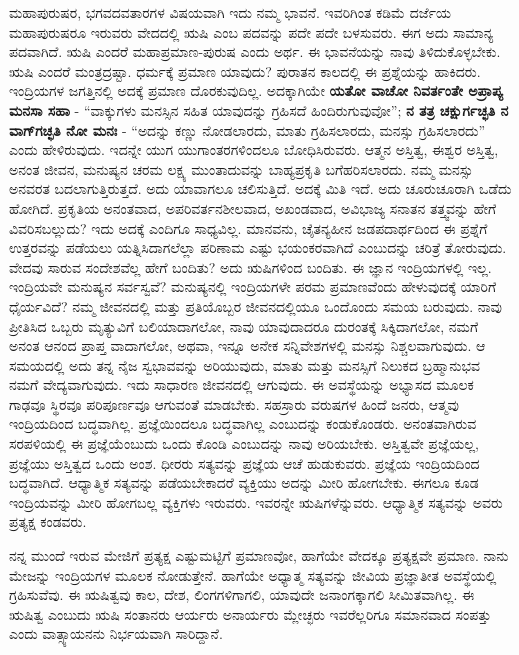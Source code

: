 ಮಹಾಪುರುಷರ, ಭಗವದವತಾರಗಳ ವಿಷಯವಾಗಿ ಇದು ನಮ್ಮ ಭಾವನೆ. ಇವರಿಗಿಂತ ಕಡಿಮೆ ದರ್ಜೆಯ ಮಹಾಪುರುಷರೂ ಇರುವರು ವೇದದಲ್ಲಿ ಋಷಿ ಎಂಬ ಪದವನ್ನು ಪದೇ ಪದೇ ಬಳಸುವರು. ಈಗ ಅದು ಸಾಮಾನ್ಯ ಪದವಾಗಿದೆ. ಋಷಿ ಎಂದರೆ ಮಹಾಪ್ರಮಾಣ-ಪುರುಷ ಎಂದು ಅರ್ಥ. ಈ ಭಾವನೆಯನ್ನು ನಾವು ತಿಳಿದುಕೊಳ್ಳಬೇಕು. ಋಷಿ ಎಂದರೆ ಮಂತ್ರದ್ರಷ್ಟಾ. ಧರ್ಮಕ್ಕೆ ಪ್ರಮಾಣ ಯಾವುದು? ಪುರಾತನ ಕಾಲದಲ್ಲಿ ಈ ಪ್ರಶ್ನೆಯನ್ನು ಹಾಕಿದರು. ಇಂದ್ರಿಯಗಳ ಜಗತ್ತಿನಲ್ಲಿ ಅದಕ್ಕೆ ಪ್ರಮಾಣ ದೊರಕುವುದಿಲ್ಲ. ಅದಕ್ಕಾಗಿಯೇ \textbf{ಯತೋ ವಾಚೋ ನಿವರ್ತಂತೇ ಅಪ್ರಾಪ್ಯ ಮನಸಾ ಸಹಾ} - “ವಾಕ್ಕುಗಳು ಮನಸ್ಸಿನ ಸಹಿತ ಯಾವುದನ್ನು ಗ್ರಹಿಸದೆ ಹಿಂದಿರುಗುವುವೋ”; \textbf{ನ ತತ್ರ ಚಕ್ಷುರ್ಗಚ್ಛತಿ ನ ವಾಗ್​ಗಚ್ಛತಿ ನೋ ಮನಃ} - “ಅದನ್ನು ಕಣ್ಣು ನೋಡಲಾರದು, ಮಾತು ಗ್ರಹಿಸಲಾರದು, ಮನಸ್ಸು ಗ್ರಹಿಸಲಾರದು” ಎಂದು ಹೇಳಿರುವುದು. ಇದನ್ನೇ ಯುಗ ಯುಗಾಂತರಗಳಿಂದಲೂ ಬೋಧಿಸಿರುವರು. ಆತ್ಮನ ಅಸ್ತಿತ್ವ, ಈಶ್ವರ ಅಸ್ತಿತ್ವ, ಅನಂತ ಜೀವನ, ಮನುಷ್ಯನ ಚರಮ ಲಕ್ಷ್ಯ ಮುಂತಾದುವನ್ನು ಬಾಹ್ಯಪ್ರಕೃತಿ ಬಗೆಹರಿಸಲಾರದು. ನಮ್ಮ ಮನಸ್ಸು ಅನವರತ ಬದಲಾಗುತ್ತಿರುತ್ತದೆ. ಅದು ಯಾವಾಗಲೂ ಚಲಿಸುತ್ತಿದೆ. ಅದಕ್ಕೆ ಮಿತಿ ಇದೆ. ಅದು ಚೂರುಚೂರಾಗಿ ಒಡೆದು ಹೋಗಿದೆ. ಪ್ರಕೃತಿಯ ಅನಂತವಾದ, ಅಪರಿವರ್ತನಶೀಲವಾದ, ಅಖಂಡವಾದ, ಅವಿಭಾಜ್ಯ ಸನಾತನ ತತ್ತ್ವವನ್ನು ಹೇಗೆ ವಿವರಿಸ\-ಬಲ್ಲುದು? ಇದು ಅದಕ್ಕೆ ಎಂದಿಗೂ ಸಾಧ್ಯವಿಲ್ಲ. ಮಾನವನು, ಚೈತನ್ಯಹೀನ ಜಡಪದಾರ್ಥದಿಂದ ಈ ಪ್ರಶ್ನೆಗೆ ಉತ್ತರವನ್ನು ಪಡೆಯಲು ಯತ್ನಿಸಿದಾಗಲೆಲ್ಲಾ ಪರಿಣಾಮ ಎಷ್ಟು ಭಯಂಕರವಾಗಿದೆ ಎಂಬುದನ್ನು ಚರಿತ್ರೆ ತೋರುವುದು. ವೇದವು ಸಾರುವ ಸಂದೇಶವೆಲ್ಲ ಹೇಗೆ ಬಂದಿತು? ಅದು ಋಷಿಗಳಿಂದ ಬಂದಿತು. ಈ ಜ್ಞಾನ ಇಂದ್ರಿಯಗಳಲ್ಲಿ ಇಲ್ಲ. ಇಂದ್ರಿಯವೇ ಮನುಷ್ಯನ ಸರ್ವಸ್ವವೆ? ಮನುಷ್ಯನಲ್ಲಿ ಇಂದ್ರಿಯಗಳೇ ಪರಮ ಪ್ರಮಾಣವೆಂದು ಹೇಳುವುದಕ್ಕೆ ಯಾರಿಗೆ ಧೈರ್ಯವಿದೆ? ನಮ್ಮ ಜೀವನದಲ್ಲಿ ಮತ್ತು ಪ್ರತಿಯೊಬ್ಬರ ಜೀವನದಲ್ಲಿಯೂ ಒಂದೊಂದು ಸಮಯ ಬರುವುದು. ನಾವು ಪ್ರೀತಿಸಿದ ಒಬ್ಬರು ಮೃತ್ಯುವಿಗೆ ಬಲಿಯಾದಾಗಲೋ, ನಾವು ಯಾವುದಾದರೂ ದುರಂತಕ್ಕೆ ಸಿಕ್ಕಿ\-ದಾಗಲೋ, ನಮಗೆ ಅನಂತ ಆನಂದ ಪ್ರಾಪ್ತ ವಾದಾಗಲೋ, ಅಥವಾ, ಇನ್ನೂ ಅನೇಕ ಸನ್ನಿವೇಶಗಳಲ್ಲಿ ಮನಸ್ಸು ನಿಶ್ಚಲವಾಗುವುದು. ಆ ಸಮಯದಲ್ಲಿ ಅದು ತನ್ನ ನೈಜ ಸ್ವಭಾವವನ್ನು ಅರಿಯುವುದು, ಮಾತು ಮತ್ತು ಮನಸ್ಸಿಗೆ ನಿಲುಕದ ಬ್ರಹ್ಮಾನುಭವ ನಮಗೆ ವೇದ್ಯವಾಗುವುದು. ಇದು ಸಾಧಾರಣ ಜೀವನದಲ್ಲಿ ಆಗುವುದು. ಈ ಅವಸ್ಥೆಯನ್ನು ಅಭ್ಯಾಸದ ಮೂಲಕ ಗಾಢವೂ ಸ್ಥಿರವೂ ಪರಿಪೂರ್ಣವೂ ಆಗುವಂತೆ ಮಾಡಬೇಕು. ಸಹಸ್ರಾರು ವರುಷಗಳ ಹಿಂದೆ ಜನರು, ಆತ್ಮವು ಇಂದ್ರಿಯದಿಂದ ಬದ್ಧವಾಗಿಲ್ಲ. ಪ್ರಜ್ಞೆಯಿಂದಲೂ  ಬದ್ಧವಾಗಿಲ್ಲ ಎಂಬುದನ್ನು ಕಂಡುಕೊಂಡರು. ಅನಂತವಾಗಿರುವ ಸರಪಳಿಯಲ್ಲಿ ಈ ಪ್ರಜ್ಞೆಯೆಂಬುದು ಒಂದು ಕೊಂಡಿ ಎಂಬುದನ್ನು ನಾವು ಅರಿಯಬೇಕು. ಅಸ್ತಿತ್ವವೇ ಪ್ರಜ್ಞೆಯಲ್ಲ, ಪ್ರಜ್ಞೆಯು ಅಸ್ತಿತ್ವದ ಒಂದು ಅಂಶ. ಧೀರರು ಸತ್ಯವನ್ನು ಪ್ರಜ್ಞೆಯ ಆಚೆ ಹುಡುಕುವರು. ಪ್ರಜ್ಞೆಯ ಇಂದ್ರಿಯದಿಂದ ಬದ್ಧವಾಗಿದೆ. ಆಧ್ಯಾತ್ಮಿಕ ಸತ್ಯವನ್ನು ಪಡೆಯಬೇಕಾದರೆ ವ್ಯಕ್ತಿಯು ಅದನ್ನು ಮೀರಿ ಹೋಗಬೇಕು. ಈಗಲೂ ಕೂಡ ಇಂದ್ರಿಯವನ್ನು ಮೀರಿ ಹೋಗಬಲ್ಲ ವ್ಯಕ್ತಿಗಳು ಇರುವರು. ಇವರನ್ನೇ ಋಷಿಗಳೆನ್ನುವರು. ಆಧ್ಯಾತ್ಮಿಕ ಸತ್ಯವನ್ನು ಅವರು ಪ್ರತ್ಯಕ್ಷ ಕಂಡವರು.

ನನ್ನ ಮುಂದೆ ಇರುವ ಮೇಜಿಗೆ ಪ್ರತ್ಯಕ್ಷ ಎಷ್ಟುಮಟ್ಟಿಗೆ ಪ್ರಮಾಣವೋ, ಹಾಗೆಯೇ ವೇದಕ್ಕೂ ಪ್ರತ್ಯಕ್ಷವೇ ಪ್ರಮಾಣ. ನಾನು ಮೇಜನ್ನು ಇಂದ್ರಿಯಗಳ ಮೂಲಕ ನೋಡುತ್ತೇನೆ. ಹಾಗೆಯೇ ಅಧ್ಯಾತ್ಮ ಸತ್ಯವನ್ನು ಜೀವಿಯ ಪ್ರಜ್ಞಾತೀತ ಅವಸ್ಥೆಯಲ್ಲಿ ಗ್ರಹಿಸುವೆವು. ಈ ಋಷಿತ್ವವು ಕಾಲ, ದೇಶ, ಲಿಂಗಗಳಿಗಾಗಲಿ, ಯಾವುದೇ ಜನಾಂಗಕ್ಕಾಗಲಿ ಸೀಮಿತವಾಗಿಲ್ಲ. ಈ ಋಷಿತ್ವ ಎಂಬುದು ಋಷಿ ಸಂತಾನರು ಆರ್ಯರು ಅನಾರ್ಯರು ಮ್ಲೇಚ್ಛರು ಇವರೆಲ್ಲರಿಗೂ ಸಮಾನವಾದ ಸಂಪತ್ತು ಎಂದು ವಾತ್ಸ್ಯಾಯನನು ನಿರ್ಭಯವಾಗಿ ಸಾರಿದ್ದಾನೆ.

